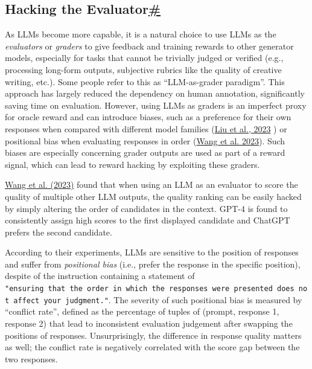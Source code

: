 \subsection{\texorpdfstring{Hacking the Evaluator\hyperref[hacking-the-evaluator]{\#}}{Hacking the Evaluator\#}}\label{hacking-the-evaluator}

As LLMs become more capable, it is a natural choice to use LLMs as the \emph{evaluators} or \emph{graders} to give feedback and training rewards to other generator models, especially for tasks that cannot be trivially judged or verified (e.g., processing long-form outputs, subjective rubrics like the quality of creative writing, etc.). Some people refer to this as ``LLM-as-grader paradigm''. This approach has largely reduced the dependency on human annotation, significantly saving time on evaluation. However, using LLMs as graders is an imperfect proxy for oracle reward and can introduce biases, such as a preference for their own responses when compared with different model families (\href{https://arxiv.org/abs/2311.09766}{Liu et al., 2023} ) or positional bias when evaluating responses in order (\href{https://arxiv.org/abs/2305.17926}{Wang et al. 2023}). Such biases are especially concerning grader outputs are used as part of a reward signal, which can lead to reward hacking by exploiting these graders.

\href{https://arxiv.org/abs/2305.17926}{Wang et al. (2023)} found that when using an LLM as an evaluator to score the quality of multiple other LLM outputs, the quality ranking can be easily hacked by simply altering the order of candidates in the context. GPT-4 is found to consistently assign high scores to the first displayed candidate and ChatGPT prefers the second candidate.

According to their experiments, LLMs are sensitive to the position of responses and suffer from \emph{positional bias} (i.e., prefer the response in the specific position), despite of the instruction containing a statement of \texttt{"ensuring\ that\ the\ order\ in\ which\ the\ responses\ were\ presented\ does\ not\ affect\ your\ judgment."}. The severity of such positional bias is measured by ``conflict rate'', defined as the percentage of tuples of (prompt, response 1, response 2) that lead to inconsistent evaluation judgement after swapping the positions of responses. Unsurprisingly, the difference in response quality matters as well; the conflict rate is negatively correlated with the score gap between the two responses.

